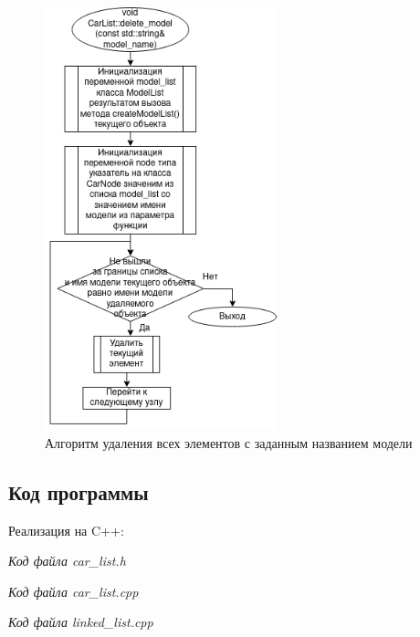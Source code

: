 \documentclass[a4paper, 14pt]{extarticle}
\begin{document}
\begin{figure}[htpb]
  \centering
  \includegraphics[width=0.6\textwidth]{pictures/delete_model.png}
  \caption{Алгоритм удаления всех элементов с заданным названием модели}
  \label{fig:create_list}
\end{figure}
\newpage
\subsection{Код программы}
Реализация на C++:

\textit{Код файла car\_list.h}


\textit{Код файла car\_list.cpp}


\textit{Код файла linked\_list.cpp}

\newpage
\end{document}
